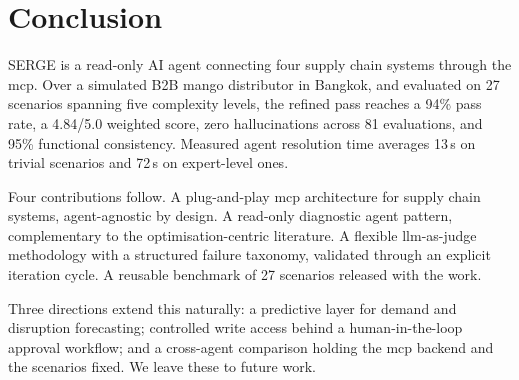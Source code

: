 
\chapter{Conclusion}
\label{ch:conclusion}

SERGE is a read-only AI agent connecting four supply chain systems through the \gls{mcp}. Over a simulated B2B mango distributor in Bangkok, and evaluated on 27 scenarios spanning five complexity levels, the refined pass reaches a 94\% pass rate, a 4.84/5.0 weighted score, zero hallucinations across 81 evaluations, and 95\% functional consistency. Measured agent resolution time averages 13\,s on trivial scenarios and 72\,s on expert-level ones.

Four contributions follow. A plug-and-play \gls{mcp} architecture for supply chain systems, agent-agnostic by design. A read-only diagnostic agent pattern, complementary to the optimisation-centric literature. A flexible \gls{llm}-as-judge methodology with a structured failure taxonomy, validated through an explicit iteration cycle. A reusable benchmark of 27 scenarios released with the work.

Three directions extend this naturally: a predictive layer for demand and disruption forecasting; controlled write access behind a human-in-the-loop approval workflow; and a cross-agent comparison holding the \gls{mcp} backend and the scenarios fixed. We leave these to future work.
